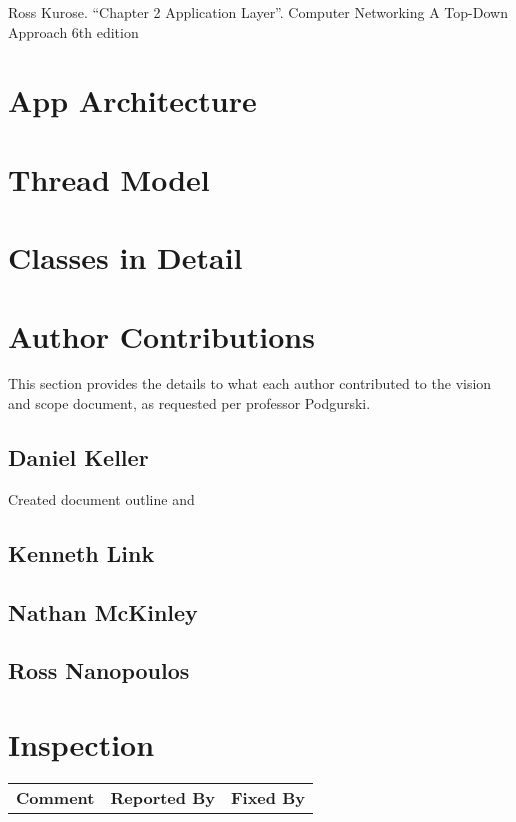 \documentclass[letter]{scrartcl}
\begin{document}
Ross Kurose. “Chapter 2 Application Layer”. Computer Networking A Top-Down Approach 6th edition

\section{App Architecture}

\section{Thread Model}

\section{Classes in Detail}

\pagebreak
\section{Author Contributions}
This section provides the details to what each author contributed to the vision and scope document, as requested per professor Podgurski.
\subsection{Daniel Keller}
Created document outline and 
\subsection{Kenneth Link}

\subsection{Nathan McKinley}

\subsection{Ross Nanopoulos}


\section{Inspection}
\begin{tabularx}{\textwidth}{X c c}
\textbf{Comment} & \textbf{Reported By} & \textbf{Fixed By} \\
\end{tabularx}
\end{document}
